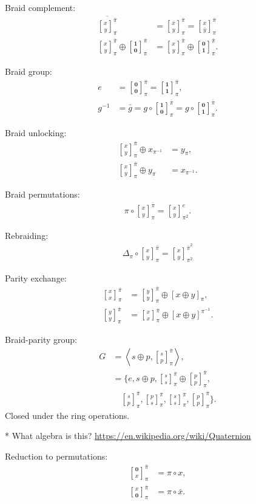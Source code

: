 \documentclass[twocolumn, aps, amsmath, amssymb, nofootinbib, superscriptaddress, longbibliography, doublefloatfix, table-of-contents, eqsecnum, rmp]{revtex4-2}
\def\zerovec{\mathbf{0}}
\def\onevec{\mathbf{1}}
\newcommand{\stackbraid}[2]{{\genfrac{[}{]}{0pt}{}{{#1}}{{#2}}}^{\bar{\pi}}_{\pi}}
\newcommand{\stackbraidpow}[3]{{\genfrac{[}{]}{0pt}{}{{#1}}{{#2}}}^{\bar{\pi}^{#3}}_{\pi^#3}}
\newcommand{\stackbraidgen}[4]{{\genfrac{[}{]}{0pt}{}{{#1}}{{#2}}}^{#3}_{#4}}
\begin{document}
Braid complement:
\begin{align}
	\overline{\stackbraid{x}{y}} &= \stackbraid{\bar{x}}{y} = \stackbraid{x}{\bar{y}} \nonumber\\
\stackbraid{x}{y} \oplus \stackbraid{\onevec}{\zerovec} &= \stackbraid{x}{y} \oplus \stackbraid{\zerovec}{\onevec}.
\end{align}

Braid group:
\begin{align}
	e &= \stackbraid{\zerovec}{\zerovec} = \stackbraid{\onevec}{\onevec},\nonumber\\
	g^{-1} &= \bar{g} = g\circ \stackbraid{\onevec}{\zerovec} = g\circ \stackbraid{\zerovec}{\onevec}.
\end{align}

Braid unlocking:
\begin{align}
	\stackbraid{x}{y} \oplus x_{\pi^{-1}} &= y_\pi,\nonumber\\
	\stackbraid{x}{y} \oplus y_{\pi} &= x_{\pi^{-1}}.
\end{align}

Braid permutations:
\begin{align}
	\pi \circ \stackbraid{x}{y} = \stackbraidgen{x}{y}{e}{\pi^2}.
\end{align}

Rebraiding:
\begin{align}
	\Delta_\pi \circ \stackbraid{x}{y} = \stackbraidpow{x}{y}{2}
\end{align}

Parity exchange:
\begin{align}
	\stackbraid{x}{x} &= \stackbraid{y}{y} \oplus [x\oplus y]_\pi,\nonumber\\
	\stackbraid{y}{y} &= \stackbraid{x}{x} \oplus [x\oplus y]^{\pi^{-1}}.
\end{align}

Braid-parity group:
\begin{align}
	G &= \left\langle s\oplus p, \stackbraid{s}{p} \right\rangle,\nonumber\\
	&= \{e, s\oplus p, \stackbraid{s}{s} \oplus \stackbraid{p}{p},\nonumber\\
	&\quad \stackbraid{s}{p}, \stackbraid{p}{s}, \stackbraid{s}{s}, \stackbraid{p}{p} \}.
\end{align}
Closed under the ring operations.

* What algebra is this? \url{https://en.wikipedia.org/wiki/Quaternion}

Reduction to permutations:
\begin{align}
	\stackbraid{\zerovec}{x} &= \pi \circ x,\nonumber\\
	\stackbraid{x}{\zerovec} &= \pi \circ \bar{x}.
\end{align}
\end{document}
